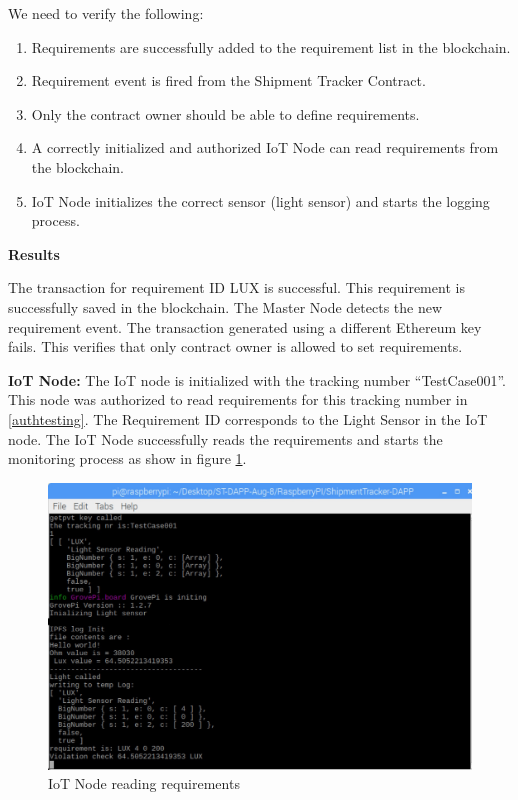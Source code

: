 We need to verify the following:

\begin{enumerate}
\item Requirements are successfully added to the requirement list in the blockchain.
\item Requirement event is fired from the Shipment Tracker Contract. 
\item Only the contract owner should be able to define requirements.
\item A correctly initialized and authorized IoT Node can read requirements from the blockchain.
\item  IoT Node initializes the correct sensor (light sensor) and starts the logging process.
\end{enumerate}

\textbf{Results}

The transaction for requirement ID LUX is successful. This requirement is successfully saved in the blockchain. The Master Node detects the new requirement event. The transaction generated using a different Ethereum key fails. This verifies that only contract owner is allowed to set requirements.
 
\textbf{IoT Node:}
The IoT node is initialized with the tracking number “TestCase001”. This node was authorized to read requirements for this tracking number in \ref{authtesting}. The Requirement ID corresponds to the Light Sensor in the IoT node. The IoT Node successfully reads the requirements and starts the monitoring process as show in figure \ref{fig:IoTreq}.

\begin{figure}[h]
	\centering
    \includegraphics[width=140mm,scale=1]{figs/IoTreq}
	\caption{IoT Node reading requirements}
	\label{fig:IoTreq} 
\end{figure}

